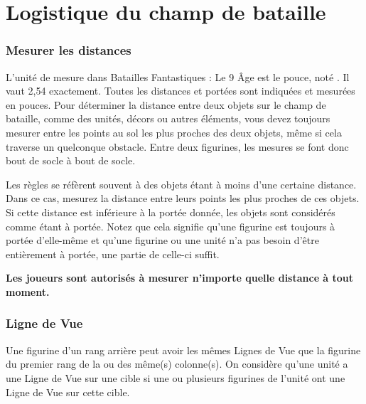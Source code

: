 
\part{Logistique du champ de bataille}

\section{Mesurer les distances}

L'unité de mesure dans Batailles Fantastiques : Le 9\ieme{} Âge est le pouce, noté \distance{}. Il vaut 2,54 {\centi\meter} exactement. Toutes les distances et portées sont indiquées et mesurées en pouces. Pour déterminer la distance entre deux objets sur le champ de bataille, comme des unités, décors ou autres éléments, vous devez toujours mesurer entre les points au sol les plus proches des deux objets, même si cela traverse un quelconque obstacle. Entre deux figurines, les mesures se font donc bout de socle à bout de socle.

Les règles se réfèrent souvent à des objets étant à moins d'une certaine distance. Dans ce cas, mesurez la distance entre leurs points les plus proches de ces objets. Si cette distance est inférieure à la portée donnée, les objets sont considérés comme étant à portée. Notez que cela signifie qu'une figurine est toujours à portée d'elle-même et qu'une figurine ou une unité n'a pas besoin d'être entièrement à portée, une partie de celle-ci suffit.
 
\textbf{Les joueurs sont autorisés à mesurer n'importe quelle distance à tout moment.}

\section{Ligne de Vue}

 Une figurine d'un rang arrière peut avoir les mêmes Lignes de Vue que la figurine du premier rang de la ou des même(s) colonne(s). On considère qu'une unité a une Ligne de Vue sur une cible si une ou plusieurs figurines de l'unité ont une Ligne de Vue sur cette cible. 

